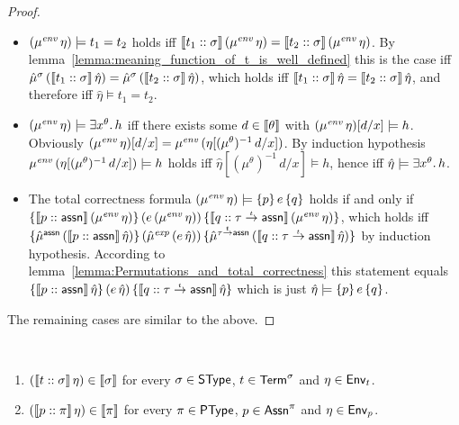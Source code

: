 \documentclass[12pt,a4paper]{report}
\newcommand{\sexp}{\nstyle{exp}}
\newcommand{\senv}{\nstyle{env}}
\begin{document}
\begin{proof}
\begin{itemize}
    \item $(\mu^\senv\,\eta) \models t_1 = t_2$ holds iff
          $\semantic{\tj{t_1}{\sigma}}\,(\mu^\senv\,\eta) =\semantic{\tj{t_2}{\sigma}}\,(\mu^\senv\,\eta)$.
          By lemma~\ref{lemma:meaning_function_of_t_is_well_defined} this is the case iff
          $\hat{\mu}^\sigma\,(\llbracket{t_1}\mathrel{::}{\sigma}\rrbracket\,\hat{\eta})
           =\hat{\mu}^\sigma\,(\llbracket{t_2}\mathrel{::}{\sigma}\rrbracket\,\hat{\eta})$, which holds iff
          $\llbracket{t_1}\mathrel{::}{\sigma}\rrbracket\,\hat{\eta} = \llbracket{t_2}\mathrel{::}{\sigma}\rrbracket\,\hat{\eta}$, and
          therefore iff $\hat{\eta}\models t_1 = t_2$.

    \item $(\mu^\senv\,\eta) \models \qex{x^\theta}{h}$ iff there exists some
          $d \in \llbracket\theta\rrbracket$ with $(\mu^\senv\,\eta)[d/x] \models h$.
          Obviously $(\mu^\senv\,\eta)[d/x] = \mu^\senv\,(\eta[(\mu^\theta)^{-1}\,d/x])$.
          By induction hypothesis $\mu^\senv\,(\eta[(\mu^\theta)^{-1}\,d/x]) \models h$
          holds iff $\hat{\eta}[(\mu^\theta)^{-1}\,d/x] \models h$, hence iff
          $\hat{\eta}\models \exists x^\theta.\,h$.

    \item The total correctness formula $(\mu^\senv\,\eta)\models\triple{p}{e}{q}$ holds if and only if
          $\triple{\semantic{\tj{p}{\tassn}}\,(\mu^\senv\,\eta)}
                  {(e\,(\mu^\senv\,\eta))}
                  {\semantic{\tj{q}{\ttarrow{\tau}{\tassn}}}\,(\mu^\senv\,\eta)}$,
          which holds iff
          $\triple{\hat{\mu}^\tassn\,(\semantic{\tj{p}{\tassn}}\,\hat{\eta})}
                  {(\hat{\mu}^\sexp\,(e\,\hat{\eta}))}
                  {\hat{\mu}^{\ttarrow{\tau}{\tassn}}\,(\semantic{\tj{q}{\ttarrow{\tau}{\tassn}}}\,\hat{\eta})}$
          by induction hypothesis. According to lemma~\ref{lemma:Permutations_and_total_correctness} this
          statement equals
          $\{\llbracket{p}\mathrel{::}{\mathsf{assn}}\rrbracket\,\hat{\eta}\}\,(e\,\hat{\eta})\,\{\llbracket{q}\mathrel{::}{\tau\stackrel{_t}{\to}\mathsf{assn}}\rrbracket\,\hat{\eta}\}$
          which is just $\hat{\eta} \models \{p\}\,e\,\{q\}$.
  \end{itemize}
  The remaining cases are similar to the above.
\end{proof}

\begin{theorem} \
  \begin{enumerate}
    \item $(\llbracket{t}\mathrel{::}{\sigma}\rrbracket\,\eta) \in \llbracket\sigma\rrbracket$
          for every $\sigma\in\mathsf{SType}$, $t\in\mathsf{Term}^\sigma$ and $\eta\in\mathsf{Env}_t$.
    \item $(\llbracket{p}\mathrel{::}{\pi}\rrbracket\,\eta) \in \llbracket\pi\rrbracket$
          for every $\pi\in\mathsf{PType}$, $p\in\mathsf{Assn}^\pi$ and $\eta\in\mathsf{Env}_p$.
  \end{enumerate}
\end{theorem}
\end{document}
